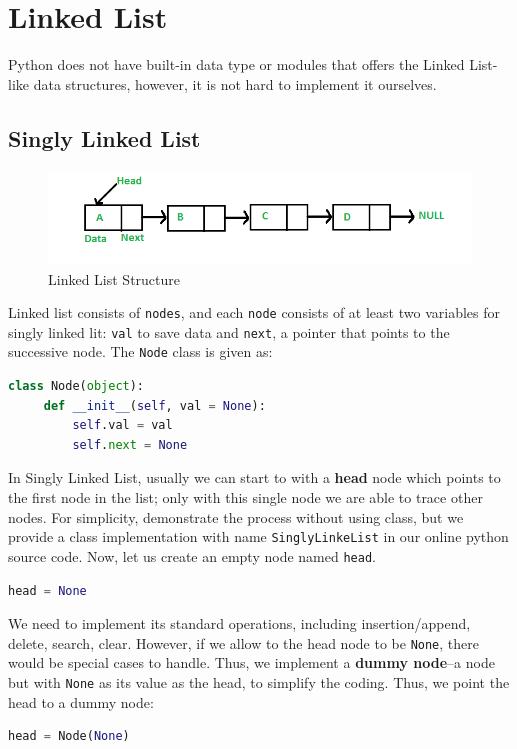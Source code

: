 \documentclass[../main.tex]{subfiles}
\begin{document}
\section{Linked List}
\label{chapter_linked_list}
Python does not have built-in data type or modules that offers the Linked List-like data structures, however, it is not hard to implement it ourselves.  
\subsection{Singly Linked List}
\label{linked_list_subsec_singly}
\begin{figure}[h!]
    \centering
    \includegraphics[width=.98\columnwidth]{fig/linked_list1.png}
    \caption{Linked List Structure}
    \label{fig:singly_linkedlist}
\end{figure}

Linked list consists of \texttt{nodes}, and each \texttt{node} consists of at least two  variables for singly linked lit: \texttt{val} to save data and \texttt{next}, a pointer  that points to the successive node. The \texttt{Node} class is given as:
\begin{lstlisting}[language=Python]
class Node(object):
     def __init__(self, val = None):
         self.val = val
         self.next = None
\end{lstlisting}

In Singly Linked List, usually we can start to with a \textbf{head} node which points to the first node in the list; only with this single node we are able to trace other nodes. For simplicity, demonstrate the process without using class, but we provide a class implementation with name \texttt{SinglyLinkeList} in our online python source code. Now, let us create an empty node named \texttt{head}.
\begin{lstlisting}[language=Python]
head = None
\end{lstlisting}
We need to implement its standard operations, including insertion/append, delete, search, clear. However, if we allow to the head node to be \texttt{None}, there would be special cases to handle. Thus, we implement a \textbf{dummy node}--a node but with \texttt{None} as its value as the head, to simplify the coding. Thus, we point the head to a dummy node: 
\begin{lstlisting}[language=Python]
head = Node(None)
\end{lstlisting}
\end{document}
